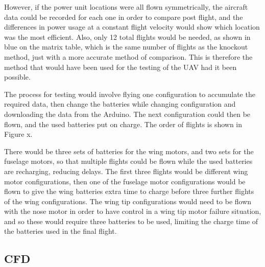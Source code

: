 \documentclass[../../main.tex]{subfiles}
\begin{document}
However, if the power unit locations were all flown symmetrically, the aircraft data could be recorded for each one in order to compare post flight, and the differences in power usage at a constant flight velocity would show which location was the most efficient.
Also, only 12 total flights would be needed, as shown in blue on the matrix table, which is the same number of flights as the knockout method, just with a more accurate method of comparison.
This is therefore the method that would have been used for the testing of the UAV had it been possible.  

The process for testing would involve flying one configuration to accumulate the required data, then change the batteries while changing configuration and downloading the data from the Arduino.
The next configuration could then be flown, and the used batteries put on charge.
The order of flights is shown in Figure x. 


There would be three sets of batteries for the wing motors, and two sets for the fuselage motors, so that multiple flights could be flown while the used batteries are recharging, reducing delays.
The first three flights would be different wing motor configurations, then one of the fuselage motor configurations would be flown to give the wing batteries extra time to charge before three further flights of the wing configurations.
The wing tip configurations would need to be flown with the nose motor in order to have control in a wing tip motor failure situation, and so these would require three batteries to be used, limiting the charge time of the batteries used in the final flight.


\subsection{CFD} \label{sec:project-review:testing-and-evaluation:cfd}
\end{document}
